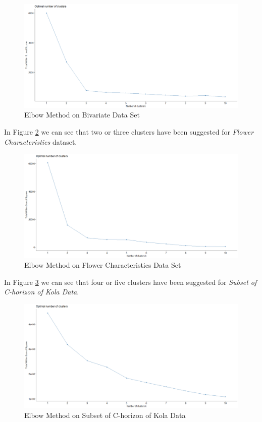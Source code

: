 \begin{itemize}
\begin{figure}[h!]
  \centering
  \includegraphics[scale=1.3]{figures/results/xclara/elbow.png}
  \caption{Elbow Method on Bivariate Data Set}
  \label{fig:elbow7}
\end{figure}

\newpage

In Figure \ref{fig:elbow8} we can see that two or three clusters have been suggested for \textit{Flower Characteristics} dataset.

\begin{figure}[h!]
  \centering
  \includegraphics[scale=1.3]{figures/results/flower/elbow.png}
  \caption{Elbow Method on Flower Characteristics Data Set}
  \label{fig:elbow8}
\end{figure}

\vspace{15mm}

In Figure \ref{fig:elbow9} we can see that four or five clusters have been suggested for \textit{Subset of C-horizon of Kola Data}.

\begin{figure}[h!]
  \centering
  \includegraphics[scale=1.3]{figures/results/chorsub/elbow.png}
  \caption{Elbow Method on Subset of C-horizon of Kola Data}
  \label{fig:elbow9}
\end{figure}


\end{itemize}
